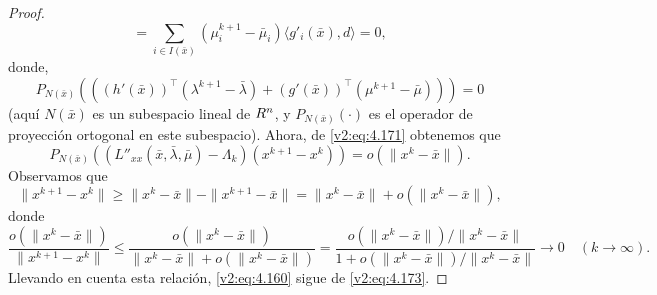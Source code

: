 \begin{proof}
\begin{equation}
        = \sum_{i \in I(\bar{x})} (\mu_i^{k+1} - \bar{\mu}_i) \langle g'_i(\bar{x}), d \rangle = 0,
        \label{v2:eq:4.172}
    \end{equation}
    donde,
    \begin{equation}
        P_{N(\bar{x})} \left( ((h'(\bar{x}))^\top(\lambda^{k+1} - \bar{\lambda}) + (g'(\bar{x}))^\top(\mu^{k+1} - \bar{\mu})) \right) = 0
    \end{equation}
    (aquí $N(\bar{x})$ es un subespacio lineal de $R^n$, y $P_{N(\bar{x})}(\cdot)$ es el operador de proyección ortogonal en este subespacio). Ahora, de \eqref{v2:eq:4.171} obtenemos que
    \begin{equation}
        P_{N(\bar{x})} \left( (L''_{xx}(\bar{x}, \bar{\lambda}, \bar{\mu}) - \Lambda_k)(x^{k+1} - x^k) \right) = o(\|x^k - \bar{x}\|).
        \label{v2:eq:4.173}
    \end{equation}
    Observamos que
    \[
        \|x^{k+1} - x^k\| \ge \|x^k - \bar{x}\| - \|x^{k+1} - \bar{x}\| = \|x^k - \bar{x}\| + o(\|x^k - \bar{x}\|),
    \]
    donde
    \[
        \frac{o(\|x^k - \bar{x}\|)}{\|x^{k+1} - x^k\|} \le \frac{o(\|x^k - \bar{x}\|)}{\|x^k - \bar{x}\| + o(\|x^k - \bar{x}\|)} = \frac{o(\|x^k - \bar{x}\|)/\|x^k - \bar{x}\|}{1 + o(\|x^k - \bar{x}\|)/\|x^k - \bar{x}\|} \to 0 \quad (k \to \infty).
    \]
    Llevando en cuenta esta relación, \eqref{v2:eq:4.160} sigue de \eqref{v2:eq:4.173}.


\end{proof}
